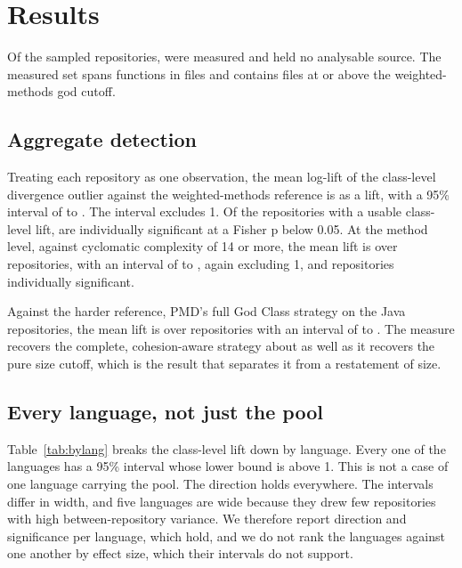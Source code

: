\documentclass[11pt,a4paper]{article}
\begin{document}
\section{Results}\label{sec:results}
Of the \nSampled{} sampled repositories, \nMeasured{} were measured and \nErrored{}
held no analysable source. The measured set spans \nFuncs{} functions in \nFiles{}
files and contains \nWmcGods{} files at or above the weighted-methods god cutoff.

\subsection{Aggregate detection}
Treating each repository as one observation, the mean log-lift of the class-level
divergence outlier against the weighted-methods reference is \classLift{} as a
lift, with a 95\% interval of \classLo{} to \classHi{}. The interval excludes 1.
Of the \classN{} repositories with a usable class-level lift, \classSig{} are
individually significant at a Fisher p below 0.05. At the method level, against
cyclomatic complexity of 14 or more, the mean lift is \methodLift{} over \methodN{}
repositories, with an interval of \methodLo{} to \methodHi{}, again excluding 1,
and \methodSig{} repositories individually significant.

Against the harder reference, PMD's full God Class strategy on the Java
repositories, the mean lift is \pmdLift{} over \pmdN{} repositories with an interval
of \pmdLo{} to \pmdHi{}. The measure recovers the complete, cohesion-aware strategy
about as well as it recovers the pure size cutoff, which is the result that
separates it from a restatement of size.

\subsection{Every language, not just the pool}
Table~\ref{tab:bylang} breaks the class-level lift down by language. Every one of
the \nLangs{} languages has a 95\% interval whose lower bound is above 1. This is
not a case of one language carrying the pool. The direction holds everywhere. The
intervals differ in width, and five languages are wide because they drew few
repositories with high between-repository variance. We therefore report direction
and significance per language, which hold, and we do not rank the languages against
one another by effect size, which their intervals do not support.
\end{document}
